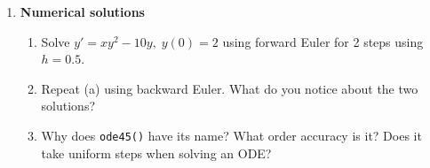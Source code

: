 \documentclass[letterpaper, fontsize=12pt]{scrartcl} %
\numberwithin{equation}{section} %
\numberwithin{figure}{section} %
\numberwithin{table}{section} %
\begin{document}
\begin{enumerate}
\begin{enumerate}[label = (\alph*)]
\end{enumerate}

\clearpage
\item \textbf{Numerical solutions}
\begin{enumerate}[label = (\alph*)]
\item Solve $y' = xy^2 - 10y, \; y(0) = 2$ using forward Euler for 2 steps using $ h = 0.5$. 

\item Repeat (a) using backward Euler. What do you notice about the two solutions?
%

\item Why does \texttt{ode45()} have its name? What order accuracy is it? Does it take uniform steps when solving an ODE? 



\end{enumerate}
\end{enumerate}
\end{document}
